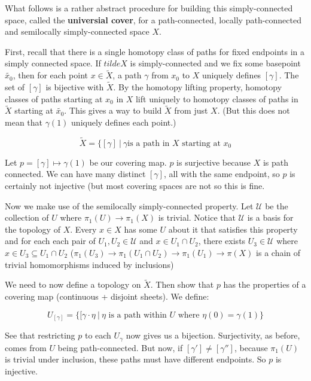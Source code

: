 \documentclass[10pt]{article}
\begin{document}
\begin{example}
	What follows is a rather abstract procedure for building this
	simply-connected space, called the \textbf{universial cover}, for a
	path-connected, locally path-connected and semilocally simply-connected space
	$X$.

	First, recall that there is a single homotopy class of paths for fixed
	endpoints in a simply connected space. If $tilde{X}$ is simply-connected and 
	we fix some basepoint $\tilde{x_0}$, then for each point $x \in \tilde{X}$, a path
	$\gamma$ from $x_0$ to $X$ uniquely defines $[\gamma]$. The set of $[\gamma]$ is
	bijective with $\tilde{X}$. By the homotopy lifting property, homotopy
	classes of paths starting at $x_0$ in $X$ lift uniquely to homotopy classes of paths
	in $\tilde{X}$ starting at $\tilde{x_0}$. This gives a way to build
	$\tilde{X}$ from just $X$. (But this does not mean that $\gamma(1)$ uniquely
	defines each point.)

	\[\tilde{X} = \{ [\gamma] ~|~ \gamma \text{is a path in } X \text{ starting at } x_0\]

	Let $p = [\gamma] \mapsto \gamma(1)$ be our covering map. $p$ is surjective
	because $X$ is path connected. We can have many distinct $[\gamma]$, all with
	the same endpoint, so $p$ is certainly not injective (but most covering
	spaces are not so this is fine.

	Now we make use of the semilocally simply-connected property. Let
	$\mathcal{U}$ be the collection of $U$ where $\pi_1(U) \to \pi_1(X)$ is
	trivial. Notice that $\mathcal{U}$ is a basis for the topology of $X$. Every
	$x \in X$ has some $U$ about it that satisfies this property and for each
	each pair of $U_1, U_2 \in \mathcal{U}$ and $x \in U_1 \cap U_2$, there
	exists $U_3 \in \mathcal{U}$ where $x \in U_3 \subseteq U_1 \cap U_2$
	($\pi_1(U_3) \to \pi_1(U_1 \cap U_2) \to \pi_1(U_1) \to \pi(X)$ is a chain of
	trivial homomorphisms induced by inclusions)

	We need to now define a topology on $\tilde{X}$. Then show that $p$ has the
	properties of a covering map (continuous + disjoint sheets). We define:

	\[U_{[\gamma]} = \{ [\gamma \cdot \eta ~|~ \eta \text{ is a path within } U \text{ where } \eta(0) = \gamma(1) \}\]

	See that restricting $p$ to each $U_{\gamma}$ now gives us a bijection.
	Surjectivity, as before, comes from $U$ being path-connected. But now, if 
	$[\gamma'] \neq [\gamma'']$, because $\pi_1(U)$ is trivial under inclusion,
	these paths must have different endpoints. So $p$ is injective.


\end{example}
\end{document}
